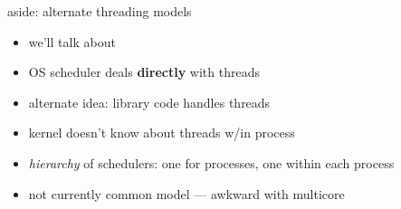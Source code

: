 

\begin{frame}{aside: alternate threading models}
\begin{itemize}
\item we'll talk about 
\item OS scheduler deals \textbf{directly} with threads
\vspace{1cm}
\item alternate idea: library code handles threads
\item kernel doesn't know about threads w/in process
\item \textit{hierarchy} of schedulers: one for processes, one within each process
\item not currently common model --- awkward with multicore
\end{itemize}
\end{frame}

